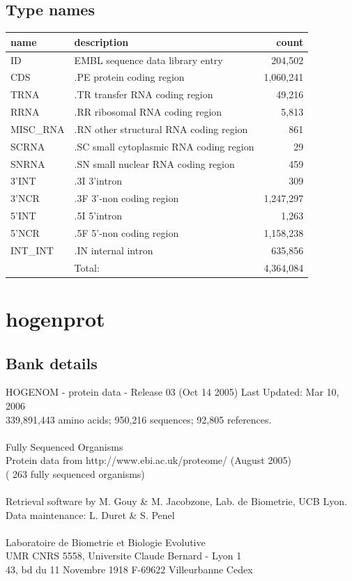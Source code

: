 \documentclass{article}
\begin{document}
\begin{Schunk}
\subsection{Type names}
\noindent\begin{tabular}{llr}
\hline \hline
name & description & count \\
\hline
ID  &  EMBL sequence data library entry  &  204,502 \\
CDS  &  .PE protein coding region  &  1,060,241 \\
TRNA  &  .TR transfer RNA coding region  &  49,216 \\
RRNA  &  .RR ribosomal RNA coding region  &  5,813 \\
MISC\_RNA  &  .RN other structural RNA coding region  &  861 \\
SCRNA  &  .SC small cytoplasmic RNA coding region  &  29 \\
SNRNA  &  .SN small nuclear RNA coding region  &  459 \\
3'INT  &  .3I 3'intron  &  309 \\
3'NCR  &  .3F  3'-non coding region  &  1,247,297 \\
5'INT  &  .5I 5'intron  &  1,263 \\
5'NCR  &  .5F  5'-non coding region  &  1,158,238 \\
INT\_INT  &  .IN  internal intron  &  635,856 \\
\hline
 & Total: & 4,364,084 \\
\hline \hline
\end{tabular}

\section{ hogenprot }
\subsection{Bank details}
HOGENOM - protein data - Release 03 (Oct 14 2005) Last Updated: Mar 10, 2006\\
339,891,443 amino acids; 950,216 sequences; 92,805 references.\\
\\
Fully Sequenced Organisms\\
Protein data from http://www.ebi.ac.uk/proteome/ (August 2005)\\
( 263 fully sequenced organisms)\\
\\
Retrieval software by M. Gouy \& M. Jacobzone, Lab. de Biometrie, UCB Lyon.\\
Data maintenance: L. Duret \& S. Penel\\
\\
Laboratoire de Biometrie et Biologie Evolutive\\
UMR CNRS 5558, Universite Claude Bernard - Lyon 1\\
43, bd du 11 Novembre 1918 F-69622 Villeurbanne Cedex\\



\end{Schunk}
\end{document}
